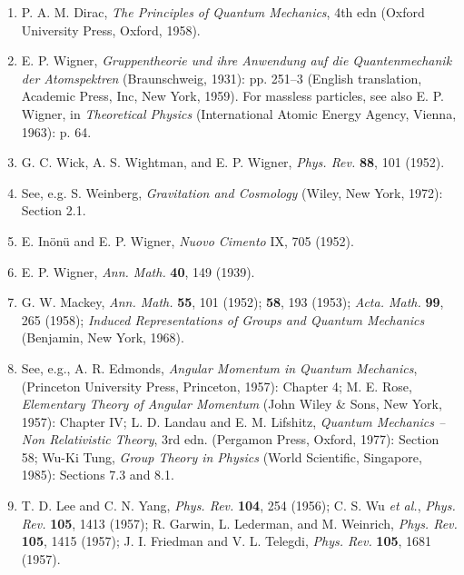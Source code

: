 \begin{enumerate}
\item\label{ref:2.1} P. A. M. Dirac, \emph{The Principles of Quantum Mechanics}, 4th edn
  (Oxford University Press, Oxford, 1958).

\item\label{ref:2.2} E. P. Wigner, \emph{Gruppentheorie und ihre Anwendung auf die
  Quantenmechanik der Atomspektren} (Braunschweig, 1931): pp. 251--3 (English
  translation, Academic Press, Inc, New York, 1959). For massless particles,
  see also E. P. Wigner, in \emph{Theoretical Physics} (International Atomic
  Energy Agency, Vienna, 1963): p. 64.

\item\label{ref:2.3} G. C. Wick, A. S. Wightman, and E. P. Wigner, \emph{Phys. Rev.}
  \textbf{88}, 101 (1952).

\item[3a.]\label{ref:2.3a} See, e.g. S. Weinberg, \emph{Gravitation and Cosmology} (Wiley,
  New York, 1972): Section 2.1.

\item[4.]\label{ref:2.4} E. In\"on\"u and E. P. Wigner, \emph{Nuovo Cimento} IX, 705
  (1952).

\item[5.]\label{ref:2.5} E. P. Wigner, \emph{Ann. Math.} \textbf{40}, 149 (1939).

\item[6.]\label{ref:2.6} G. W. Mackey, \emph{Ann. Math.} \textbf{55}, 101 (1952);
  \textbf{58}, 193 (1953); \emph{Acta. Math.} \textbf{99}, 265 (1958);
  \emph{Induced Representations of Groups and Quantum Mechanics} (Benjamin,
  New York, 1968).

\item[7.]\label{ref:2.7} See, e.g., A. R. Edmonds, \emph{Angular Momentum in Quantum
  Mechanics}, (Princeton University Press, Princeton, 1957): Chapter 4; M. E.
  Rose, \emph{Elementary Theory of Angular Momentum} (John Wiley \& Sons, New
  York, 1957): Chapter IV; L. D. Landau and E. M. Lifshitz, \emph{Quantum
  Mechanics -- Non Relativistic Theory}, 3rd edn. (Pergamon Press, Oxford,
  1977): Section 58; Wu-Ki Tung, \emph{Group Theory in Physics} (World
  Scientific, Singapore, 1985): Sections 7.3 and 8.1.

\item[8.]\label{ref:2.8} T. D. Lee and C. N. Yang, \emph{Phys. Rev.} \textbf{104}, 254
  (1956); C. S. Wu \emph{et al.}, \emph{Phys. Rev.} \textbf{105}, 1413
  (1957); R. Garwin, L. Lederman, and M. Weinrich, \emph{Phys. Rev.}
  \textbf{105}, 1415 (1957); J. I. Friedman and V. L. Telegdi, \emph{Phys.
  Rev.} \textbf{105}, 1681 (1957).


\end{enumerate}
